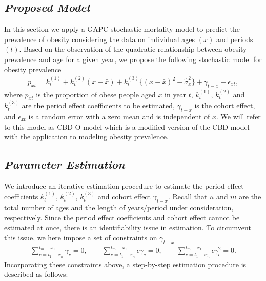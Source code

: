 \documentclass[11pt,letterpaper]{article}
\numberwithin{equation}{section}
\begin{document}
\subsection{\textit{Proposed Model}}
In this section we apply a GAPC stochastic mortality model to predict the prevalence of obesity considering the data on individual ages $(x)$ and periods $(t)$. Based on the observation of the quadratic relationship between  obesity prevalence and age for a given year, we propose the following stochastic model for obesity prevalence
\begin{eqnarray}
\label{eq:proposed}
p_{xt}=k_t^{(1)}+ k_t^{(2)}(x - \bar{x}) + k_t^{(3)}\{(x - \bar{x})^{2} - \hat\sigma_x^{2}\} + \gamma_{t-x}+\epsilon_{xt},
\end{eqnarray}
where $p_{xt}$ is the  proportion of obese people aged $x$ in year $t$,
$k_t^{(1)}$, $k_t^{(2)}$ and  $k_t^{(3)}$ are the period effect coefficients to be estimated,
$\gamma_{t-x}$ is the cohort effect, and $\epsilon_{xt}$ is a random error with a zero mean and is independent of $x$. We will refer to this model as CBD-O model which is a modified version of the CBD model with the application to modeling obesity prevalence.

\subsection{\textit{Parameter Estimation}}
We introduce an iterative estimation procedure to estimate the period effect coefficients $k_t^{(1)}$, $k_t^{(2)}$, $k_t^{(3)}$ and  cohort effect $\gamma_{t-x}$.  Recall that $n$ and $m$ are  the total number of ages and the length of years/period under consideration, respectively.
 Since the period effect coefficients and cohort effect cannot be estimated at once, there is an identifiability issue in estimation. To circumvent this issue, we here impose a set of constraints on $\gamma_{t-x}$
\begin{eqnarray}\label{eq:constraint}
\sum_{c=t_1-x_n}^{t_m-x_1}\gamma_c=0 ,\quad\quad \sum_{c=t_1-x_n}^{t_m-x_1}c\gamma_c=0,\quad\quad \sum_{c=t_1-x_n}^{t_m-x_1}c\gamma_c^2=0.
\end{eqnarray}
Incorporating these constraints above, a step-by-step estimation procedure is described as follows:
\end{document}
